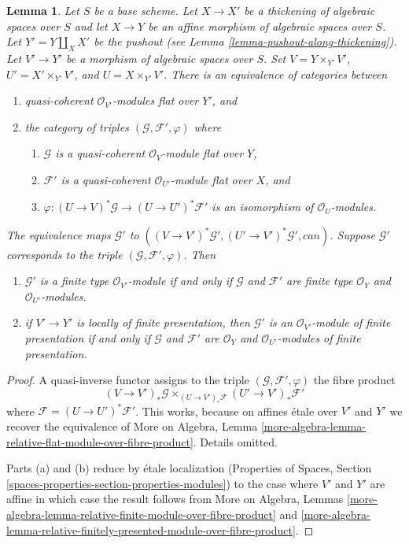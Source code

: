 \documentclass{stacks-project}
\theoremstyle{plain}
\newtheorem{lemma}[subsection]{Lemma}
\theoremstyle{definition}
\theoremstyle{remark}
\numberwithin{equation}{subsection}
\begin{document}
\begin{lemma}
\label{lemma-space-over-pushout-flat-modules}
Let $S$ be a base scheme.
Let $X \to X'$ be a thickening of algebraic spaces over $S$
and let $X \to Y$ be an affine morphism of algebraic spaces over $S$.
Let $Y' = Y \amalg_X X'$ be the pushout
(see Lemma \ref{lemma-pushout-along-thickening}).
Let $V' \to Y'$ be a morphism of algebraic spaces over $S$. Set
$V = Y \times_{Y'} V'$, $U' = X' \times_{Y'} V'$, and $U = X \times_{Y'} V'$.
There is an equivalence of categories between
\begin{enumerate}
\item quasi-coherent $\mathcal{O}_{V'}$-modules flat over $Y'$, and
\item the category of triples $(\mathcal{G}, \mathcal{F}', \varphi)$ where
\begin{enumerate}
\item $\mathcal{G}$ is a quasi-coherent $\mathcal{O}_V$-module flat over $Y$,
\item $\mathcal{F}'$ is a quasi-coherent $\mathcal{O}_{U'}$-module flat
over $X$, and
\item $\varphi : (U \to V)^*\mathcal{G} \to (U \to U')^*\mathcal{F}'$
is an isomorphism of $\mathcal{O}_U$-modules.
\end{enumerate}
\end{enumerate}
The equivalence maps $\mathcal{G}'$ to
$((V \to V')^*\mathcal{G}', (U' \to V')^*\mathcal{G}', can)$.
Suppose $\mathcal{G}'$ corresponds to the triple
$(\mathcal{G}, \mathcal{F}', \varphi)$. Then
\begin{enumerate}
\item[(a)] $\mathcal{G}'$ is a finite type $\mathcal{O}_{V'}$-module if and
only if $\mathcal{G}$ and $\mathcal{F}'$ are finite type
$\mathcal{O}_Y$ and $\mathcal{O}_{U'}$-modules.
\item[(b)] if $V' \to Y'$ is locally of finite presentation, then
$\mathcal{G}'$ is an $\mathcal{O}_{V'}$-module of finite
presentation if and only if $\mathcal{G}$ and $\mathcal{F}'$ are
$\mathcal{O}_Y$ and $\mathcal{O}_{U'}$-modules of finite presentation.
\end{enumerate}
\end{lemma}

\begin{proof}
A quasi-inverse functor assigns to the triple
$(\mathcal{G}, \mathcal{F}', \varphi)$ the fibre product
$$
(V \to V')_*\mathcal{G}
\times_{(U \to V')_*\mathcal{F}}
(U' \to V')_*\mathcal{F}'
$$
where $\mathcal{F} = (U \to U')^*\mathcal{F}'$. This works, because on
affines \'etale over $V'$ and $Y'$ we recover the equivalence of
More on Algebra, Lemma
\ref{more-algebra-lemma-relative-flat-module-over-fibre-product}.
Details omitted.

\medskip\noindent
Parts (a) and (b) reduce by \'etale localization
(Properties of Spaces, Section
\ref{spaces-properties-section-properties-modules})
to the case where $V'$ and $Y'$ are affine in which case the result
follows from
More on Algebra, Lemmas
\ref{more-algebra-lemma-relative-finite-module-over-fibre-product} and
\ref{more-algebra-lemma-relative-finitely-presented-module-over-fibre-product}.
\end{proof}
\end{document}
